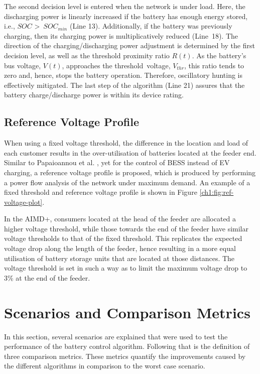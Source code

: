 The second decision level is entered when the network is under load. Here, the discharging power is linearly increased if the battery has enough energy stored, i.e., $SOC$ \textgreater~$SOC_{min}$ (Line 13). Additionally, if the battery was previously charging, then its charging power is multiplicatively reduced (Line~18). The direction of the charging/discharging power adjustment is determined by the first decision level, as well as the threshold proximity ratio $R(t)$. As the battery's bus voltage, $V(t)$, approaches the threshold~voltage, $V_{thr}$, this ratio tends to zero and, hence, stops the battery operation. Therefore, oscillatory hunting is effectively mitigated. The last step of the algorithm (Line 21) assures that the battery charge/discharge power is within its device rating.

\subsection{Reference Voltage Profile}

When using a fixed voltage threshold, the difference in the location and load of each customer results in the over-utilisation of batteries located at the feeder end. Similar to Papaioannou et al. \cite{Papaioannou2015}, yet for the control of BESS instead of EV charging, a reference voltage profile is proposed, which is produced by performing a power flow analysis of the network under maximum demand. An example of a fixed threshold and reference voltage profile is shown in Figure \ref{ch1:fig:ref-voltage-plot}.



In the AIMD+, consumers located at the head of the feeder are allocated a higher voltage threshold, while those towards the end of the feeder have similar voltage thresholds to that of the fixed threshold. This replicates the expected voltage drop along the length of the feeder, hence resulting in a more equal utilisation of battery storage units that are located at those distances. The voltage threshold is set in such a way as to limit the maximum voltage drop to 3\% at the end of the feeder.

\section{Scenarios and Comparison Metrics}
\label{ch1:sec:scenarios-and-comparison-metrics}

In this section, several scenarios are explained that were used to test the performance of the battery control algorithm. Following that is the definition of three comparison metrics. These metrics quantify the improvements caused by the different algorithms in comparison to the worst case scenario.

